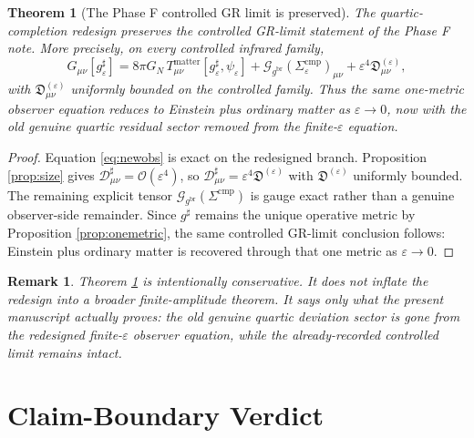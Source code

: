 \documentclass[11pt]{article}
\newcommand{\ObserverMetric}{g^{\mathrm{br}}}
\newcommand{\CompletedMetric}{g^{\sharp}}
\newcommand{\CompShift}{\Sigma^{\mathrm{cmp}}}
\newcommand{\GaugeBook}{\mathcal G_{\ObserverMetric}}
\newcommand{\CompDec}{\mathcal D_{\mu\nu}^{\sharp}}
\newcommand{\epsIR}{\varepsilon}
\newtheorem{remark}{Remark}
\newtheorem{theorem}{Theorem}
\begin{document}
\begin{theorem}[The Phase F controlled GR limit is preserved]
\label{thm:phaseF}
The quartic-completion redesign preserves the controlled GR-limit statement of the Phase F note. More precisely, on every controlled infrared family,
\begin{equation}
G_{\mu\nu}[\CompletedMetric_{\epsIR}]
=
8\pi G_N\,T_{\mu\nu}^{\mathrm{matter}}[\CompletedMetric_{\epsIR},\psi_{\epsIR}]
+\GaugeBook(\CompShift_{\epsIR})_{\mu\nu}
+\epsIR^4\mathfrak D_{\mu\nu}^{(\epsIR)},
\label{eq:phaseFnew}
\end{equation}
with \(\mathfrak D_{\mu\nu}^{(\epsIR)}\) uniformly bounded on the controlled family. Thus the same one-metric observer equation reduces to Einstein plus ordinary matter as \(\epsIR\to0\), now with the old genuine quartic residual sector removed from the finite-\(\epsIR\) equation.
\end{theorem}

\begin{proof}
Equation \eqref{eq:newobs} is exact on the redesigned branch. Proposition \ref{prop:size} gives \(\CompDec=\mathcal O(\epsIR^4)\), so \(\CompDec=\epsIR^4\mathfrak D^{(\epsIR)}\) with \(\mathfrak D^{(\epsIR)}\) uniformly bounded. The remaining explicit tensor \(\GaugeBook(\CompShift)\) is gauge exact rather than a genuine observer-side remainder. Since \(\CompletedMetric\) remains the unique operative metric by Proposition \ref{prop:onemetric}, the same controlled GR-limit conclusion follows: Einstein plus ordinary matter is recovered through that one metric as \(\epsIR\to0\).
\end{proof}

\begin{remark}
Theorem \ref{thm:phaseF} is intentionally conservative. It does not inflate the redesign into a broader finite-amplitude theorem. It says only what the present manuscript actually proves: the old genuine quartic deviation sector is gone from the redesigned finite-\(\epsIR\) observer equation, while the already-recorded controlled limit remains intact.
\end{remark}

\section{Claim-Boundary Verdict}
\end{document}
